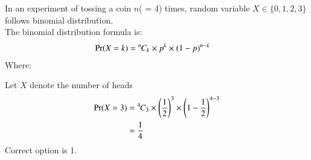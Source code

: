 
In an experiment of tossing a coin $n$( = 4) times, random variable  $X \in \lbrace 0,1,2,3 \rbrace$ follows binomial distribution.\\
The binomial distribution formula is:
\begin{align}
 \Pr( X=k ) &= {{}^{n}\mkern-1muC_{k}} \times p^k \times (1- p)^{n - k}
\end{align}
Where:
\begin{table}[h]
    \centering
\caption{The binomial distribution formula}
    \label{me2008-4:table:0}
\end{table}
Let $X$ denote the number of heads
\begin{align}
    \Pr(X=3) &=  {{}^{4}\mkern-1muC_{3}} \times \left(\frac{1}{2}\right)^3 \times \left(1- \frac{1}{2}\right)^{4 - 3}\\
    &= \frac{1}{4}
\end{align}
Correct option is 1.